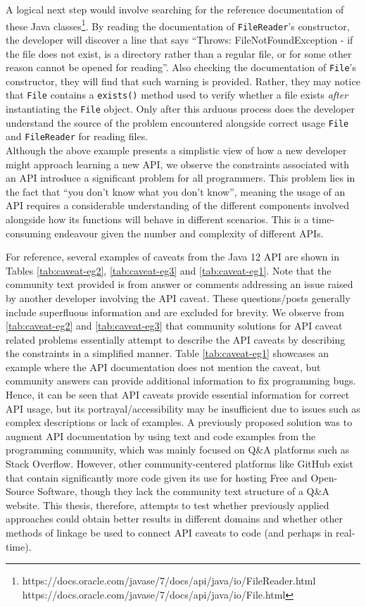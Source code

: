 A logical next step would involve searching for the reference documentation of these Java classes\footnote{https://docs.oracle.com/javase/7/docs/api/java/io/FileReader.html \\\indent https://docs.oracle.com/javase/7/docs/api/java/io/File.html}. By reading the documentation of \lstinline{FileReader}'s constructor, the developer will discover a line that says ``Throws: FileNotFoundException - if the file does not exist, is a directory rather than a regular file, or for some other reason cannot be opened for reading''. Also checking the documentation of \lstinline{File}'s constructor, they will find that such warning is provided. Rather, they may notice that \lstinline{File} contains a \lstinline{exists()} method used to verify whether a file exists \textit{after} instantiating the \lstinline{File} object. Only after this arduous process does the developer understand the source of the problem encountered alongside correct usage \lstinline{File} and \lstinline{FileReader} for reading files.\\
Although the above example presents a simplistic view of how a new developer might approach learning a new API, we observe the constraints associated with an API introduce a significant problem for all programmers. This problem lies in the fact that ``you don't know what you don't know'', meaning the usage of an API requires a considerable understanding of the different components involved alongside how its functions will behave in different scenarios. This is a time-consuming endeavour given the number and complexity of different APIs.\bigbreak

For reference, several examples of caveats from the Java 12 API are shown in Tables \ref{tab:caveat-eg2}, \ref{tab:caveat-eg3} and \ref{tab:caveat-eg1}. Note that the community text provided is from answer or comments addressing an issue raised by another developer involving the API caveat. These questions/posts generally include superfluous information and are excluded for brevity. We observe from \ref{tab:caveat-eg2} and \ref{tab:caveat-eg3} that community solutions for API caveat related problems essentially attempt to describe the API caveats by describing the constraints in a simplified manner. Table \ref{tab:caveat-eg1} showcases an example where the API documentation does not mention the caveat, but community answers can provide additional information to fix programming bugs. Hence, it can be seen that API caveats provide essential information for correct API usage, but its portrayal/accessibility may be insufficient due to issues such as complex descriptions or lack of examples. A previously proposed solution was to augment API documentation by using text and code examples from the programming community, which was mainly focused on Q\&A platforms such as Stack Overflow.  However, other community-centered platforms like GitHub exist that contain significantly more code given its use for hosting Free and Open-Source Software, though they lack the community text structure of a Q\&A website. This thesis, therefore, attempts to test whether previously applied approaches could obtain better results in different domains and whether other methods of linkage be used to connect API caveats to code (and perhaps in real-time).

